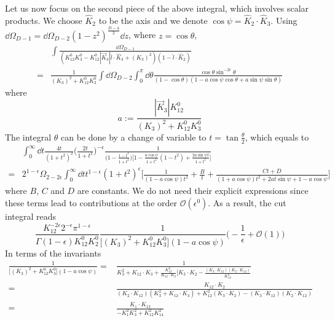 Let us now focus on the second piece of the above integral, which involves scalar products. 
We choose $\hat{K}_2$ to be the axis and we denote $\cos\psi = \hat{K}_2\cdot\hat{K}_3$. 
Using $\dd\Omega_{D-1} = \dd \Omega_{D-2}(1-z^2)^{\frac{D-4}{2}}\dd z$, where $z = \cos\theta$, 
\begin{equation*}
\begin{split}
& \int\frac{\dd \Omega_{D-1}}{(K_{12}^0 K_3^0 - K_{12}^0 |\vec{K}_3| \hat{l}\cdot \hat{K}_3 + (K_3)^2)(1-\hat{l}\cdot\hat{K}_2)}
\\
= & \frac{1}{(K_3)^2 + K_{12}^0 K_3^0}\int \dd \Omega_{D-2}
\int_0^\pi\dd\theta\frac{\cos\theta\sin^{-2\epsilon}\theta}{(1-\cos\theta)(1-a\cos\psi\cos\theta + a\sin\psi\sin\theta)}
\end{split}
\end{equation*}
where 
\begin{equation*}
a := \frac{|\vec{K}_3|K_{12}^0}{(K_3)^2 + K_{12}^0 K_3^0}
\end{equation*}
The integral \wrt $\theta$ can be done by a change of variable to $t = \tan\frac{\theta}{2}$, which equals to
\begin{equation*}
\begin{split}
& \int_0^\infty\dd t \frac{4t}{(1+t^2)^2}\Big(\frac{2t}{1+t^2}\Big)^{-\epsilon}\frac{1}{\Big(1-\frac{1-t^2}{1+t^2}\Big)\Big[1-\frac{a\cos\psi}{1+t^2}(1-t^2) + \frac{2a\sin\psi t}{1+t^2}\Big]}
\\
 =  &
2^{1-\epsilon}\Omega_{2-2\epsilon}
\int^{\infty}_0 \dd t t^{1-\epsilon}(1+t^2)^\epsilon
\Big[\frac{1}{(1-a\cos\psi)t^2} + \frac{B}{t} + \frac{Ct + D}{(1+a\cos\psi)t^2 + 2at\sin\psi  + 1-a\cos\psi}\Big]
\end{split}
\end{equation*}
where $B$, $C$ and $D$ are constants. 
We do not need their explicit expressions since these terms lead to contributions at the order $\mathcal{O}(\epsilon^0)$.
As a result, the cut integral reads
\begin{equation*}
\frac{K_{12}^{-2\epsilon}2^{-\epsilon}\pi^{1-\epsilon}}{\Gamma(1-\epsilon)K_{12}^0K_2^0}\frac{1}{\big[(K_3)^2 + K_{12}^0K_3^0\big](1-a\cos\psi)}
\Big(-\frac{1}{\epsilon} + \mathcal{O}(1)\Big)
\end{equation*}
In terms of the invariants
\begin{equation*}
\begin{split}
\frac{1}{\big[(K_3)^2 + K_{12}^0K_3^0\big](1-a\cos\psi)} 
= &
\frac{1}{K_3^2 + K_{12}\cdot K_3 + \frac{K_{12}^2}{K_{12}\cdot K_2}
\Big[K_3\cdot K_2 - \frac{(K_3\cdot K_{12})(K_2\cdot K_{12})}{K_{12}^2}}
\\
=&
\frac{K_{12}\cdot K_2}{(K_2\cdot K_{12})(K_3^2 + K_{12}\cdot K_3) + K_{12}^2(K_3\cdot K_2) - (K_3 \cdot K_{12})(K_2\cdot K_{12})}
\\
=&
\frac{K_1 \cdot K_{12}}{- K_1^2 K_3^2 + K_{12}^2 K_{14}^2}
\end{split}
\end{equation*}
